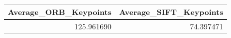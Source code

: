 \begin{tabular}{rr}
\toprule
Average_ORB_Keypoints & Average_SIFT_Keypoints \\
\midrule
125.961690 & 74.397471 \\
\bottomrule
\end{tabular}
